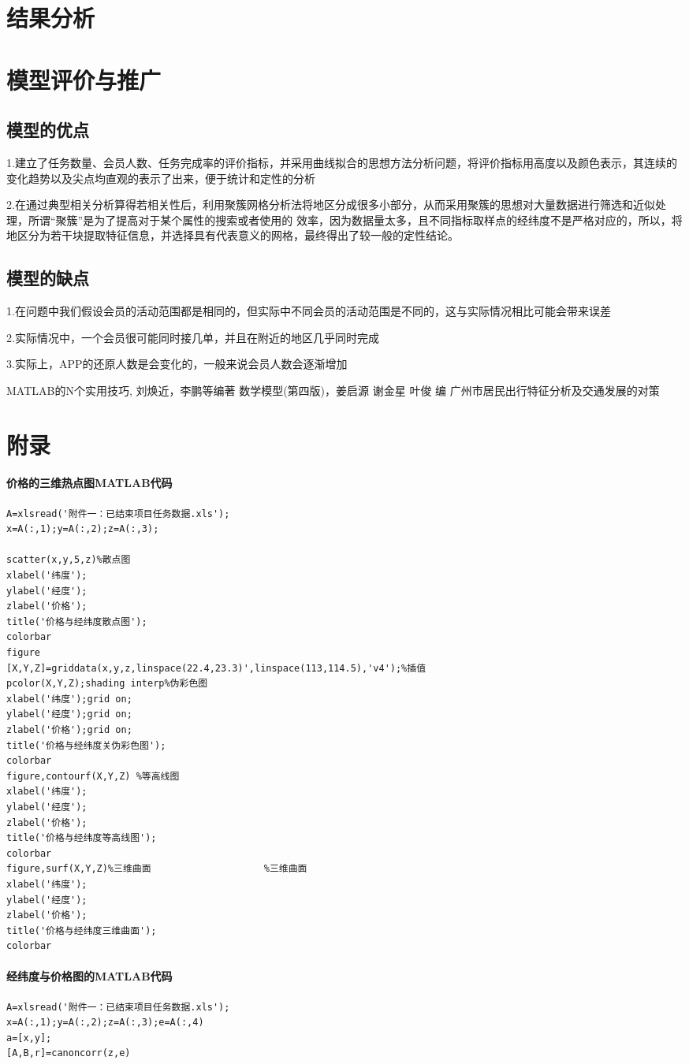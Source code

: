 \documentclass{ctexart}
\begin{document}
\section{结果分析}

\section{模型评价与推广}
\subsection{模型的优点}
1.建立了任务数量、会员人数、任务完成率的评价指标，并采用曲线拟合的思想方法分析问题，将评价指标用高度以及颜色表示，其连续的变化趋势以及尖点均直观的表示了出来，便于统计和定性的分析

2.在通过典型相关分析算得若相关性后，利用聚簇网格分析法将地区分成很多小部分，从而采用聚簇的思想对大量数据进行筛选和近似处理，所谓“聚簇”是为了提高对于某个属性的搜索或者使用的 效率，因为数据量太多，且不同指标取样点的经纬度不是严格对应的，所以，将地区分为若干块提取特征信息，并选择具有代表意义的网格，最终得出了较一般的定性结论。


\subsection{模型的缺点}
1.在问题中我们假设会员的活动范围都是相同的，但实际中不同会员的活动范围是不同的，这与实际情况相比可能会带来误差

2.实际情况中，一个会员很可能同时接几单，并且在附近的地区几乎同时完成

3.实际上，APP的还原人数是会变化的，一般来说会员人数会逐渐增加
\newpage  
\appendix 
\begin{thebibliography}{9}
 MATLAB的N个实用技巧, 刘焕近，李鹏等编著
 数学模型(第四版)，姜启源 谢金星 叶俊 编
 广州市居民出行特征分析及交通发展的对策
\end{thebibliography}
\section{附录}
\paragraph{价格的三维热点图MATLAB代码}
\begin{verbatim}
A=xlsread('附件一：已结束项目任务数据.xls');
x=A(:,1);y=A(:,2);z=A(:,3);

scatter(x,y,5,z)%散点图
xlabel('纬度');
ylabel('经度');
zlabel('价格');
title('价格与经纬度散点图');
colorbar
figure
[X,Y,Z]=griddata(x,y,z,linspace(22.4,23.3)',linspace(113,114.5),'v4');%插值
pcolor(X,Y,Z);shading interp%伪彩色图
xlabel('纬度');grid on;
ylabel('经度');grid on;
zlabel('价格');grid on;
title('价格与经纬度关伪彩色图');
colorbar
figure,contourf(X,Y,Z) %等高线图
xlabel('纬度');
ylabel('经度');
zlabel('价格');
title('价格与经纬度等高线图');
colorbar
figure,surf(X,Y,Z)%三维曲面                    %三维曲面
xlabel('纬度');
ylabel('经度');
zlabel('价格');
title('价格与经纬度三维曲面');
colorbar
\end{verbatim}
\paragraph{经纬度与价格图的MATLAB代码}
\begin{verbatim}
A=xlsread('附件一：已结束项目任务数据.xls');
x=A(:,1);y=A(:,2);z=A(:,3);e=A(:,4)
a=[x,y];
[A,B,r]=canoncorr(z,e)
\end{verbatim}
\end{document}
